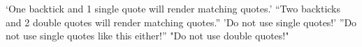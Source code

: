 \documentclass[a4paper]{article}
\begin{document}
`One backtick and 1 single quote will render matching quotes.'
``Two backticks and 2 double quotes will render matching quotes.''
'Do not use single quotes!'
''Do not use single quotes like this either!''
"Do not use double quotes!"
\end{document}
